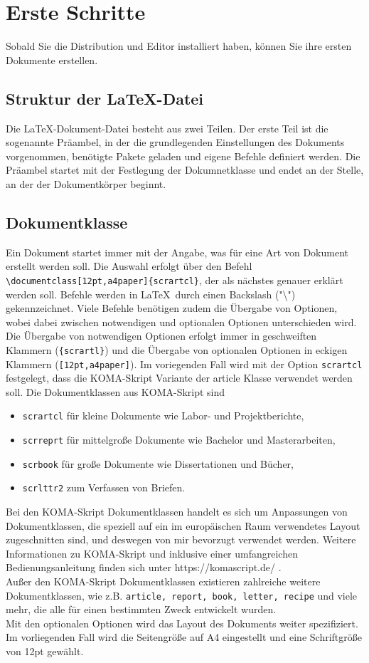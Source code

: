 \documentclass[12pt,a4paper]{scrartcl}
\begin{document}
\section{Erste Schritte}
%
Sobald Sie die Distribution und Editor installiert haben, können Sie ihre ersten Dokumente erstellen. 
%
\subsection{Struktur der \LaTeX-Datei}
%
Die \LaTeX-Dokument-Datei besteht aus zwei Teilen. 
Der erste Teil ist die sogenannte Präambel, in der die grundlegenden Einstellungen des Dokuments vorgenommen, benötigte Pakete geladen und eigene Befehle definiert werden.
Die Präambel startet mit der Festlegung der Dokumnetklasse und endet an der Stelle, an der der Dokumentkörper beginnt. 
%
\subsection{Dokumentklasse}
%
Ein Dokument startet immer mit der Angabe, was für eine Art von Dokument erstellt werden soll. 
Die Auswahl erfolgt über den Befehl \texttt{\textbackslash documentclass[12pt,a4paper]\{scrartcl\}}, der als nächstes genauer erklärt werden soll.
Befehle werden in \LaTeX\, durch einen Backslash ("\textbackslash") gekennzeichnet.
Viele Befehle benötigen zudem die Übergabe von Optionen, wobei dabei zwischen notwendigen und optionalen Optionen unterschieden wird. 
Die Übergabe von notwendigen Optionen erfolgt immer in geschweiften Klammern (\texttt{\{scrartl\}}) und die Übergabe von optionalen Optionen in eckigen Klammern (\texttt{[12pt,a4paper]}).
Im voriegenden Fall wird mit der Option \texttt{scrartcl} festgelegt, dass die KOMA-Skript Variante der article Klasse verwendet werden soll. 
Die Dokumentklassen aus KOMA-Skript sind 
%
\begin{itemize}
\item \texttt{scrartcl} für kleine Dokumente wie Labor- und Projektberichte,
\item \texttt{scrreprt} für mittelgroße Dokumente wie Bachelor und Masterarbeiten,
\item \texttt{scrbook} für große Dokumente wie Dissertationen und Bücher,
\item \texttt{scrlttr2} zum Verfassen von Briefen.
\end{itemize}
%
Bei den KOMA-Skript Dokumentklassen handelt es sich um Anpassungen von Dokumentklassen, die speziell auf ein im europäischen Raum verwendetes Layout zugeschnitten sind, und deswegen von mir bevorzugt verwendet werden. Weitere Informationen zu KOMA-Skript und inklusive einer umfangreichen Bedienungsanleitung finden sich unter https://komascript.de/ .
\\
Außer den KOMA-Skript Dokumentklassen existieren zahlreiche weitere Dokumentklassen, wie z.B.
\texttt{article, report, book, letter, recipe} und viele mehr, die alle für einen bestimmten Zweck entwickelt wurden.
\\
Mit den optionalen Optionen wird das Layout des Dokuments weiter spezifiziert.
Im vorliegenden Fall wird die Seitengröße auf A4 eingestellt und eine Schriftgröße von 12pt gewählt.
%
\end{document}
